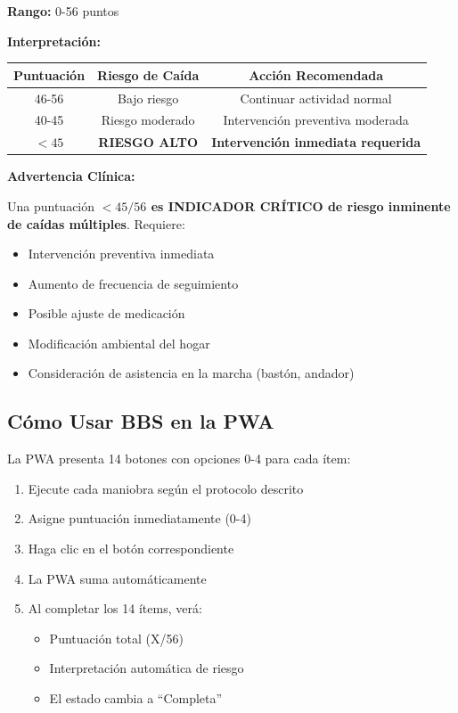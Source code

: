 \documentclass[12pt,a4paper,spanish,oneside]{book}
\begin{document}
\textbf{Rango:} 0-56 puntos

\textbf{Interpretación:}

\begin{table}[h]
  \centering
  \begin{tabular}{|c|c|c|}
    \hline
    \textbf{Puntuación} & \textbf{Riesgo de Caída} & \textbf{Acción Recomendada} \\
    \hline
    46-56 & Bajo riesgo & Continuar actividad normal \\
    \hline
    40-45 & Riesgo moderado & Intervención preventiva moderada \\
    \hline
    $< 45$ & \textbf{RIESGO ALTO} & \textbf{Intervención inmediata requerida} \\
    \hline
  \end{tabular}
\end{table}

\textbf{Advertencia Clínica:}

\begin{advertenciabox}
  Una puntuación \textbf{$< 45/56$ es INDICADOR CRÍTICO de riesgo inminente de caídas múltiples}. Requiere:
  \begin{itemize}
    \item Intervención preventiva inmediata
    \item Aumento de frecuencia de seguimiento
    \item Posible ajuste de medicación
    \item Modificación ambiental del hogar
    \item Consideración de asistencia en la marcha (bastón, andador)
  \end{itemize}
\end{advertenciabox}

\subsection{Cómo Usar BBS en la PWA}

La PWA presenta 14 botones con opciones 0-4 para cada ítem:

\begin{enumerate}
  \item Ejecute cada maniobra según el protocolo descrito
  \item Asigne puntuación inmediatamente (0-4)
  \item Haga clic en el botón correspondiente
  \item La PWA suma automáticamente
  \item Al completar los 14 ítems, verá:
  \begin{itemize}
    \item Puntuación total (X/56)
    \item Interpretación automática de riesgo
    \item El estado cambia a ``Completa''
  \end{itemize}
\end{enumerate}
\end{document}
